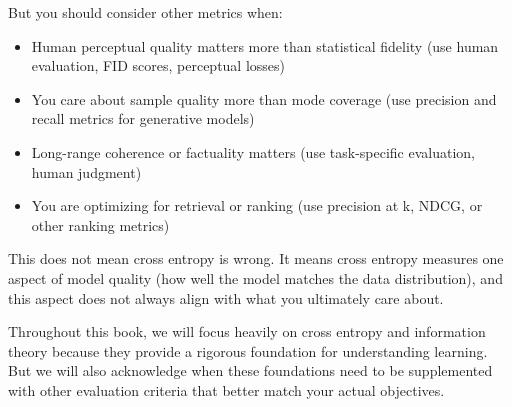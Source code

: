 But you should consider other metrics when:

\begin{itemize}
\item Human perceptual quality matters more than statistical fidelity (use human evaluation, FID scores, perceptual losses)
\item You care about sample quality more than mode coverage (use precision and recall metrics for generative models)
\item Long-range coherence or factuality matters (use task-specific evaluation, human judgment)
\item You are optimizing for retrieval or ranking (use precision at k, NDCG, or other ranking metrics)
\end{itemize}

This does not mean cross entropy is wrong. It means cross entropy measures one aspect of model quality (how well the model matches the data distribution), and this aspect does not always align with what you ultimately care about.

Throughout this book, we will focus heavily on cross entropy and information theory because they provide a rigorous foundation for understanding learning. But we will also acknowledge when these foundations need to be supplemented with other evaluation criteria that better match your actual objectives.

\vspace{2em}


